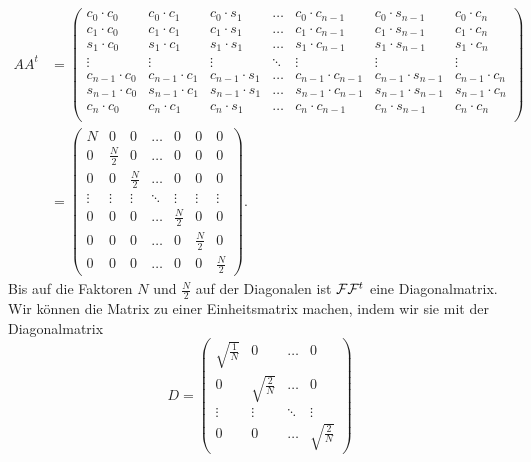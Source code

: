 \begin{align*}
AA^t
&=
\begin{pmatrix}
c_0\cdot c_0&
	c_0\cdot c_1&
		c_0\cdot s_1&
			\dots&
				c_0\cdot c_{n-1}&
					c_0\cdot s_{n-1}&
						c_0\cdot c_n\\
c_1\cdot c_0&
	c_1\cdot c_1&
		c_1\cdot s_1&
			\dots&
				c_1\cdot c_{n-1}&
					c_1\cdot s_{n-1}&
						c_1\cdot c_n\\
s_1\cdot c_0&
	s_1\cdot c_1&
		s_1\cdot s_1&
			\dots&
				s_1\cdot c_{n-1}&
					s_1\cdot s_{n-1}&
						s_1\cdot c_n\\
\vdots	&\vdots	&\vdots	&\ddots	&\vdots	&\vdots	&\vdots	\\
c_{n-1}\cdot c_0&
	c_{n-1}\cdot c_1&
		c_{n-1}\cdot s_1&
			\dots&
				c_{n-1}\cdot c_{n-1}&
					c_{n-1}\cdot s_{n-1}&
						c_{n-1}\cdot c_n\\
s_{n-1}\cdot c_0&
	s_{n-1}\cdot c_1&
		s_{n-1}\cdot s_1&
			\dots&
				s_{n-1}\cdot c_{n-1}&
					s_{n-1}\cdot s_{n-1}&
						s_{n-1}\cdot c_n\\
c_n\cdot c_0&
	c_n\cdot c_1&
		c_n\cdot s_1&
			\dots&
				c_n\cdot c_{n-1}&
					c_n\cdot s_{n-1}&
						c_n\cdot c_n\\
\end{pmatrix}
\\
&=
\begin{pmatrix}
N     &0        &0        &\dots    &0        &0        &0        \\
0     &\frac{N}2&0        &\dots    &0        &0        &0        \\
0     &0        &\frac{N}2&\dots    &0        &0        &0        \\
\vdots&\vdots   &\vdots   &\ddots   &\vdots   &\vdots   &\vdots   \\
0     &0        &0        &\dots    &\frac{N}2&0        &0        \\
0     &0        &0        &\dots    &0        &\frac{N}2&0        \\
0     &0        &0        &\dots    &0        &0        &\frac{N}2
\end{pmatrix}.
\end{align*}
Bis auf die Faktoren $N$ und $\frac{N}2$ auf der Diagonalen ist
${\cal F}{\cal F}^t$ 
eine Diagonalmatrix.
Wir können die Matrix zu einer Einheitsmatrix machen, indem wir 
sie mit der Diagonalmatrix
\begin{equation}
D
=
\begin{pmatrix}
\sqrt{\frac1N}&0&\dots&0\\
0&\sqrt{\frac{2}{N}}&\dots&0\\
\vdots&\vdots&\ddots&\vdots\\
0&0&\dots&\sqrt{\frac{2}{N}}
\end{pmatrix}
\end{equation}
